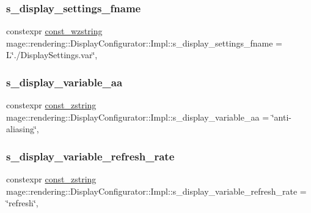\subsubsection{\texorpdfstring{s\+\_\+display\+\_\+settings\+\_\+fname}{s\_display\_settings\_fname}}
{\footnotesize\ttfamily constexpr \hyperlink{namespacemage_ac409e0f2a22292a3a4cd42742994fbf0}{const\+\_\+wzstring} mage\+::rendering\+::\+Display\+Configurator\+::\+Impl\+::s\+\_\+display\+\_\+settings\+\_\+fname = L\char`\"{}./Display\+Settings.\+var\char`\"{}\hspace{0.3cm}{\ttfamily [static]}, {\ttfamily [private]}}

\hypertarget{classmage_1_1rendering_1_1_display_configurator_1_1_impl_a017dade5658f0a4fa0a56fec2fe30d52}{}\label{classmage_1_1rendering_1_1_display_configurator_1_1_impl_a017dade5658f0a4fa0a56fec2fe30d52} 
\subsubsection{\texorpdfstring{s\+\_\+display\+\_\+variable\+\_\+aa}{s\_display\_variable\_aa}}
{\footnotesize\ttfamily constexpr \hyperlink{namespacemage_abfd9206dc607ceb5d13ec68bf075a5c0}{const\+\_\+zstring} mage\+::rendering\+::\+Display\+Configurator\+::\+Impl\+::s\+\_\+display\+\_\+variable\+\_\+aa = \char`\"{}anti-\/aliasing\char`\"{}\hspace{0.3cm}{\ttfamily [static]}, {\ttfamily [private]}}

\hypertarget{classmage_1_1rendering_1_1_display_configurator_1_1_impl_ae8cb7050d662cc3e5cd6ff97465517a6}{}\label{classmage_1_1rendering_1_1_display_configurator_1_1_impl_ae8cb7050d662cc3e5cd6ff97465517a6} 
\subsubsection{\texorpdfstring{s\+\_\+display\+\_\+variable\+\_\+refresh\+\_\+rate}{s\_display\_variable\_refresh\_rate}}
{\footnotesize\ttfamily constexpr \hyperlink{namespacemage_abfd9206dc607ceb5d13ec68bf075a5c0}{const\+\_\+zstring} mage\+::rendering\+::\+Display\+Configurator\+::\+Impl\+::s\+\_\+display\+\_\+variable\+\_\+refresh\+\_\+rate = \char`\"{}refresh\char`\"{}\hspace{0.3cm}{\ttfamily [static]}, {\ttfamily [private]}}


